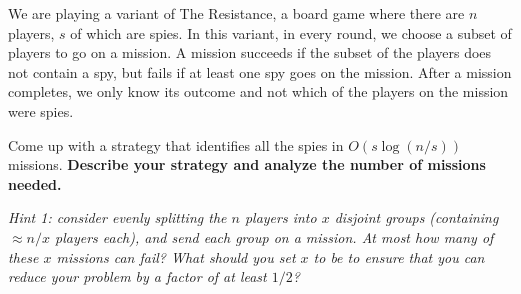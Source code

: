 \documentclass[11pt]{article}
\begin{document}
\newpage


We are playing a variant of The Resistance, a board game where there are $n$ players, $s$ of which are spies. In this variant, in every round, we choose a subset of players to go on a mission. A mission succeeds if the subset of the players does not contain a spy, but fails if at least one spy goes on the mission. After a mission completes, we only know its outcome and not which of the players on the mission were spies.

Come up with a strategy that identifies all the spies in $O(s \log (n/s))$ missions. \textbf{Describe your strategy and analyze the number of missions needed.}

\emph{Hint 1: consider evenly splitting the $n$ players into $x$ disjoint groups (containing $\approx n/x$ players each), and send each group on a mission. At most how many of these $x$ missions can fail? What should you set $x$ to be to ensure that you can reduce your problem by a factor of at least $1/2$?}
\end{document}
